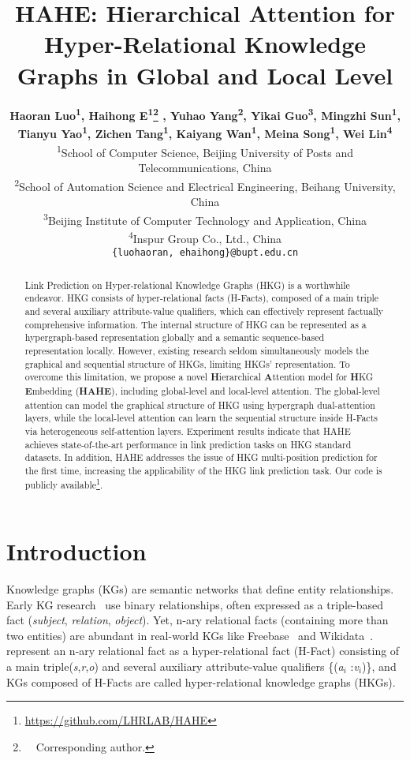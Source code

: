 \documentclass[11pt]{article}
\title{HAHE: Hierarchical Attention for Hyper-Relational Knowledge Graphs in Global and Local Level}
\author{ {\bf Haoran Luo\textsuperscript{\rm 1}, Haihong E\textsuperscript{\rm 1}\thanks{\ \ Corresponding author.}  , Yuhao Yang\textsuperscript{\rm 2}, Yikai Guo\textsuperscript{\rm 3}, Mingzhi Sun\textsuperscript{\rm 1},} \\{\bf Tianyu Yao\textsuperscript{\rm 1}, Zichen Tang\textsuperscript{\rm 1}, Kaiyang Wan\textsuperscript{\rm 1}, Meina Song\textsuperscript{\rm 1}, Wei Lin\textsuperscript{\rm 4}} \\
         \textsuperscript{1}School of Computer Science, Beijing University of Posts and Telecommunications, China \\ 
         \textsuperscript{2}School of Automation Science and Electrical Engineering, Beihang University, China \\ 
         \textsuperscript{3}Beijing Institute of Computer Technology and Application, China \\ 
         \textsuperscript{4}Inspur Group Co., Ltd., China \\ 
         \texttt{\{luohaoran, ehaihong\}@bupt.edu.cn}}
\begin{document}
\maketitle
\begin{abstract}
 Link Prediction on Hyper-relational Knowledge Graphs (HKG) is a worthwhile endeavor. HKG consists of hyper-relational facts (H-Facts), composed of a main triple and several auxiliary attribute-value qualifiers, which can effectively represent factually comprehensive information. The internal structure of HKG can be represented as a hypergraph-based representation globally and a semantic sequence-based representation locally. However, existing research seldom simultaneously models the graphical and sequential structure of HKGs, limiting HKGs' representation. To overcome this limitation, we propose a novel \textbf{H}ierarchical \textbf{A}ttention model for \textbf{H}KG \textbf{E}mbedding (\textbf{HAHE}), including global-level and local-level attention. The global-level attention can model the graphical structure of HKG using hypergraph dual-attention layers, while the local-level attention can learn the sequential structure inside H-Facts via heterogeneous self-attention layers. Experiment results indicate that HAHE achieves state-of-the-art performance in link prediction tasks on HKG standard datasets. In addition, HAHE addresses the issue of HKG multi-position prediction for the first time, increasing the applicability of the HKG link prediction task. Our code is publicly available\footnote{\url{https://github.com/LHRLAB/HAHE}}.
\end{abstract}

\section{Introduction}

Knowledge graphs (KGs) are semantic networks that define entity relationships. Early KG research~\citep{TransE,RotatE,TuckER} use binary relationships, often expressed as a triple-based fact (\textit{subject}, \textit{relation}, \textit{object}). Yet, n-ary relational facts (containing more than two entities) are abundant in real-world KGs like Freebase~\citep{Freebase} and Wikidata~\citep{Wikidata}. \citet{HINGE} represent an n-ary relational fact as a hyper-relational fact (H-Fact) consisting of a main triple(\textit{s},\textit{r},\textit{o}) and several auxiliary attribute-value qualifiers \{(\textit{a$_i$ }:\textit{v$_i$})\}, and KGs composed of H-Facts are called hyper-relational knowledge graphs (HKGs).
\end{document}
